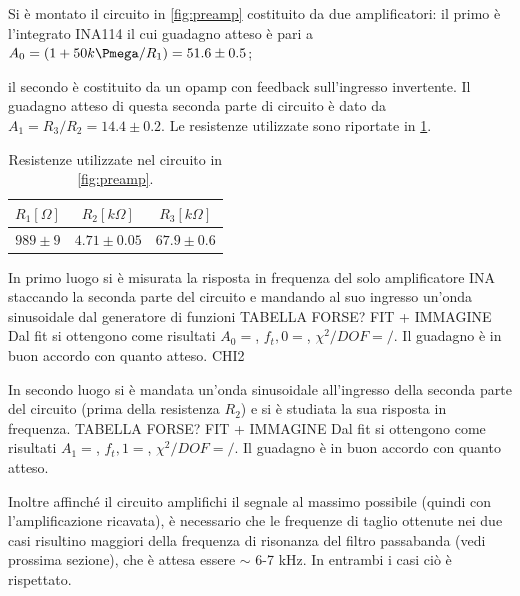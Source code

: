 \documentclass[a4paper,10pt]{article}
\begin{document}
Si è montato il circuito in \cref{fig:preamp} costituito da due amplificatori: il primo è l'integrato INA114 il cui guadagno atteso è pari a $A_0 = (1+ 50k\Pmega/R_1) = 51.6 \pm 0.5$; %



 il secondo è costituito da un opamp con feedback sull'ingresso invertente. Il guadagno atteso di questa seconda parte di circuito è dato da $A_1 = R_3/R_2 = 14.4 \pm 0.2 $.
Le resistenze utilizzate sono riportate in \cref{tab:resistenze}.

\begin{table}[H]
	\centering
	\begin{tabular}{ccc}
		\hline
		$R_1[\Omega]$ & $R_2[k\Omega]$ & $R_3[k\Omega]$\\
		\hline
		$989\pm9$ & $4.71\pm0.05$ & $67.9\pm0.6$\\
		\hline
	\end{tabular}
	\caption{Resistenze utilizzate nel circuito in \cref{fig:preamp}.}
	\label{tab:resistenze}
\end{table}

In primo luogo si è misurata la risposta in frequenza del solo amplificatore INA staccando la seconda parte del circuito e mandando al suo ingresso un'onda sinusoidale dal generatore di funzioni%
TABELLA FORSE?
FIT + IMMAGINE
Dal fit si ottengono come risultati $A_0 = $, $f_t,0 = $, $\chi^2/DOF = /$. Il guadagno è in buon accordo con quanto atteso. 
CHI2

In secondo luogo si è mandata un'onda sinusoidale all'ingresso della seconda parte del circuito (prima della resistenza $R_2$) e si è studiata la sua risposta in frequenza.
TABELLA FORSE?
FIT + IMMAGINE
Dal fit si ottengono come risultati $A_1 = $, $f_t,1 = $, $\chi^2/DOF = /$. Il guadagno è in buon accordo con quanto atteso. 

Inoltre affinché il circuito amplifichi il segnale al massimo possibile (quindi con l'amplificazione ricavata), è necessario che le frequenze di taglio ottenute nei due casi risultino maggiori della frequenza di risonanza del filtro passabanda (vedi prossima sezione), che è attesa essere $\sim$ 6-7 kHz. In entrambi i casi ciò è rispettato.
\end{document}
